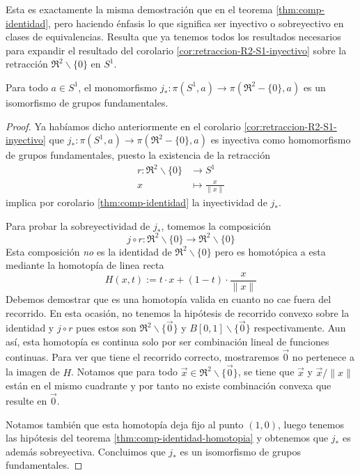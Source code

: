 Esta es exactamente la misma demostración que en el teorema
\ref{thm:comp-identidad}, pero haciendo énfasis lo que significa ser
inyectivo o sobreyectivo en clases de equivalencias. Resulta que ya
tenemos todos los resultados necesarios para expandir el resultado del
corolario \ref{cor:retraccion-R2-S1-inyectivo} sobre la
retracción \(\Re ^2 \backslash \{0\}\) en \(S^1\).

\begin{teorema}
  Para todo \(a \in S^1\), el monomorfismo \(j_* : \pi (S^1, a)
  \to \pi (\Re ^2 - \{0\}, a)\) es un isomorfismo de grupos
  fundamentales.
\end{teorema}
\begin{proof}
  Ya habíamos dicho anteriormente en el corolario
  \ref{cor:retraccion-R2-S1-inyectivo} que \( j_* : \pi (S^1, a) \to \pi
  (\Re ^2 - \{0\}, a)\) es inyectiva como homomorfismo de grupos
  fundamentales, puesto la existencia de la retracción
  \begin{align*}
    r : \Re ^2 \backslash \{0\} &\longrightarrow S^1 \\
    x &\longmapsto \frac x {\lVert x \rVert}
  \end{align*}
  implica por corolario \ref{thm:comp-identidad} la inyectividad de
  \(j_*\).

  Para probar la sobreyectividad de \(j_*\), tomemos la composición
  \[ j \circ r : \Re ^2 \backslash \{0\} \longrightarrow \Re ^2
      \backslash \{0\} \]
    Esta composición \emph{no} es la identidad de \(\Re ^2 \backslash \{0\}
  \) pero es homotópica a esta mediante la homotopía de linea recta
  \[
    H(x,t) := t \cdot x + (1 - t) \cdot \frac x {\lVert x \rVert}
  \]
  Debemos demostrar que es una homotopía valida en cuanto no cae fuera
  del recorrido. En esta ocasión, no tenemos la hipótesis de recorrido
  convexo sobre la identidad y \(j \circ r\) pues estos son \(\Re ^2
  \backslash \{\vec 0\}\) y \(B[0,1] \backslash \{\vec 0\}\)
  respectivamente. Aun así, esta homotopía es continua solo por ser
  combinación lineal de funciones continuas. Para ver que tiene el
  recorrido correcto, mostraremos \(\vec 0\) no pertenece a la imagen de
  \(H\). Notamos que para todo \(\vec x \in \Re ^2 \backslash \{\vec
  0\}\), se tiene que \(\vec x \) y \( \vec x / \lVert x \rVert\) están en
  el mismo cuadrante y por tanto no existe combinación convexa que resulte
  en \(\vec 0\).

  Notamos también que esta homotopía deja fijo al punto \((1,0)\), luego
  tenemos las hipótesis del teorema \ref{thm:comp-identidad-homotopia} y
  obtenemos que \(j_*\) es además sobreyectiva. Concluimos que \(j_*\) es
  un isomorfismo de grupos fundamentales.
\end{proof}

